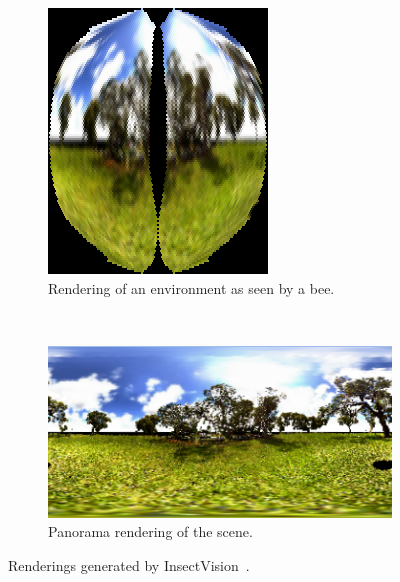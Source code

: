 \documentclass{acm_proc_article-sp}
\begin{document}
\begin{centering}
\begin{figure}
  \begin{subfigure}[t]{0.1345\textwidth}
    \centering
    \includegraphics[width=\textwidth]{beeview.png}
    \caption{Rendering of an environment as seen by a bee.}
    \label{beeview}
  \end{subfigure}
  ~
  \begin{subfigure}[t]{0.3255\textwidth}
    \centering
    \includegraphics[width=\textwidth]{beeview-panorama.png}
    \caption{Panorama rendering of the scene.}
    \label{beeviewpanorama}
  \end{subfigure}
  \caption{Renderings generated by InsectVision \cite{insectvision}.}
\end{figure}
\end{centering}
\end{document}
